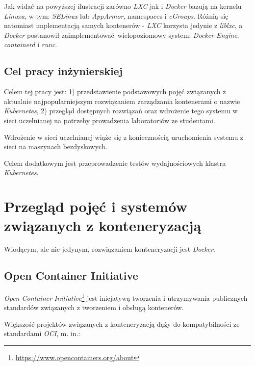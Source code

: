 \documentclass[a4paper,12pt,twoside,openany]{report}
\DeclareRobustCommand{\href}[2]{#2\footnote{\url{#1}}}
\begin{document}
Jak widać na powyższej ilustracji zarówno \emph{LXC} jak i \emph{Docker}
bazują na kernelu \emph{Linuxa}, w tym: \emph{SELinux} lub
\emph{AppArmor}, namespaces i \emph{cGroups}. Różnią się natomiast
implementacją samych kontenerów - \emph{LXC} korzysta jedynie z
\emph{liblxc}, a \emph{Docker} postanowił zaimplementować~wielopoziomowy
system: \emph{Docker Engine}, \emph{containerd} i \emph{runc}.

\hypertarget{cel-pracy-inux17cynierskiej}{%
\section{Cel pracy inżynierskiej}\label{cel-pracy-inux17cynierskiej}}

Celem tej pracy jest: 1) przedstawienie podstawowych pojęć związanych z
aktualnie najpopularniejszym rozwiązaniem zarządzania kontenerami o
nazwie \emph{Kubernetes}, 2) przegląd dostępnych rozwiązań oraz
wdrożenie tego systemu w sieci uczelnianej na potrzeby prowadzenia
laboratoriów ze studentami.

Wdrożenie w sieci uczelnianej wiąże się z koniecznością uruchomienia
systemu z sieci na maszynach bezdyskowych.

Celem dodatkowym jest przeprowadzenie testów wydajnościowych klastra
\emph{Kubernetes}.

\hypertarget{przeglux105d-pojux119ux107-i-systemuxf3w-zwiux105zanych-z-konteneryzacjux105}{%
\chapter{Przegląd pojęć i systemów związanych z
konteneryzacją}\label{przeglux105d-pojux119ux107-i-systemuxf3w-zwiux105zanych-z-konteneryzacjux105}}

Wiodącym, ale nie jedynym, rozwiązaniem konteneryzacji jest
\emph{Docker}.

\hypertarget{open-container-initiative}{%
\section{Open Container Initiative}\label{open-container-initiative}}

\href{https://www.opencontainers.org/about}{\emph{Open Container
Initiative}} jest inicjatywą tworzenia i utrzymywania publicznych
standardów związanych z tworzeniem i obsługą kontenerów.

Większość projektów związanych z konteneryzacją dąży do kompatybilności
ze standardami \emph{OCI}, m. in.:
\end{document}
